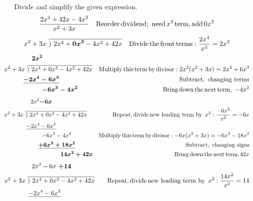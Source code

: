 \begin{example}~~~Divide and simplify the given expression.
  \begin{eqnarray*}
    \frac{2 x^4 + 42x - 4 x^2}{x^2 + 3x} &  & \operatorname{Reorder} \operatorname{dividend};~
    \operatorname{need} x^3 \operatorname{term}, \operatorname{add} 0 x^3
	\end{eqnarray*}
\newpage
  \begin{eqnarray*}
    x^2 + 3x~ \overline{)~2 x^4 + \boldsymbol{0 x^3} - 4 x^2 + 42x} &  & \operatorname{Divide} \operatorname{the}
    \operatorname{front} \operatorname{terms} : \frac{2 x^4}{x^2} = 2 x^2
	\end{eqnarray*}
	\begin{eqnarray*}
    \boldsymbol{2 x^2}~~~~~~~~~~~~~~~~~~~~~~~~  &  & \\
    x^2 + 3x~ \overline{)~2 x^4 + 0 x^3 - 4 x^2 + 42x} &  & \operatorname{Multiply}
    \operatorname{this} \operatorname{term} \operatorname{by} \operatorname{divisor} : 2 x^2 (x^2 + 3x) = 2 x^4 +
    6 x^3\\
    \underline{\boldsymbol{- 2 x^4 - 6 x^3} }~~~~~~~~~~~~~~~~ &  & \operatorname{Subtract,~changing~terms}\\
    \boldsymbol{- 6 x^3 - 4 x^2}~~~~~~~  &  & \operatorname{Bring} \operatorname{down} \operatorname{the}
    \operatorname{next} \operatorname{term,~}-4x^2
   \end{eqnarray*}
  \begin{eqnarray*}
	  2 x^2 \boldsymbol{- 6 x}~~~~~~~~~~~~~~~~~~~~~  &  & \\
    x^2 + 3x~ \overline{)~2 x^4 + 0 x^3 - 4 x^2 + 42x}~~~ &  & \operatorname{Repeat,}
    \operatorname{divide} \operatorname{new~leading~term~by~}x^2 : \frac{- 6 x^3}{x^2} = - 6 x\\
    \underline{- 2 x^4 - 6 x^3 }~~~~~~~~~~~~~~~~~~~ &  & \\
    - 6 x^3 - 4 x^2~~~~~~~~~~~ &  & \operatorname{Multiply} \operatorname{this} \operatorname{term} \operatorname{by}
    \operatorname{divisor} : - 6 x (x^2 + 3x) = - 6 x^3 - 18 x^2\\
    \underline{\boldsymbol{+ 6 x^3 + 18 x^2} }~~~~~~~~~  &  & \operatorname{Subtract,~changing~signs}\\
    \boldsymbol{14 x^2 + 42x} &  & \operatorname{Bring} \operatorname{down} \operatorname{the} \operatorname{next}
    \operatorname{term,} 42x
		\end{eqnarray*}
  \begin{eqnarray*}
    2 x^2 - 6 x ~\tmmathbf{+14}~~~~~~~~~~~~~~  &  & \\
    x^2 + 3x~ \overline{)~2 x^4 + 0 x^3 - 4 x^2 + 42x}~~~ &  & \tmop{Repeat},
    \tmop{divide} \tmop{new~leading~term~by~} x^2: \frac{14 x^2}{x^2} = 14\\
    \underline{- 2 x^4 - 6 x^3 }~~~~~~~~~~~~~~~~~~~ &  & \\

\end{eqnarray*}
\end{example}
